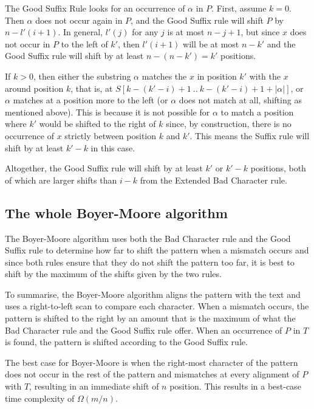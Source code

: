 The Good Suffix Rule looks for an occurrence of $\alpha$ in $P$. First, assume $k=0$. Then $\alpha$ does not occur again in $P$, and the Good Suffix rule will shift $P$ by $n-l'(i+1)$. In general, $l'(j)$ for any $j$ is at most $n-j+1$, but since $x$ does not occur in $P$ to the left of $k'$, then $l'(i+1)$ will be at most $n-k'$ and the Good Suffix rule will shift by at least $n-(n-k') = k'$ positions. 

If $k>0$, then either the substring $\alpha$ matches the $x$ in position $k'$ with the $x$ around position $k$, that is, at $S[k-(k'-i)+1\ ..\ k-(k'-i)+1+|\alpha|]$, or $\alpha$ matches at a position more to the left (or $\alpha$ does not match at all, shifting as mentioned above). This is because it is not possible for $\alpha$ to match a position where $k'$ would be shifted to the right of $k$ since, by construction, there is no occurrence of $x$ strictly between position $k$ and $k'$. This means the Suffix rule will shift by at least $k'-k$ in this case. 

Altogether, the Good Suffix rule will shift by at least $k'$ or $k'-k$ positions, both of which are larger shifts than $i-k$ from the Extended Bad Character rule. 

\rightline{$\square$}

\subsection{The whole Boyer-Moore algorithm}

The Boyer-Moore algorithm uses both the Bad Character rule and the Good Suffix rule to determine how far to shift the pattern when a mismatch occurs and since both rules ensure that they do not shift the pattern too far, it is best to shift by the maximum of the shifts given by the two rules. 

To summarise, the Boyer-Moore algorithm aligns the pattern with the text and uses a right-to-left scan to compare each character. When a mismatch occurs, the pattern is shifted to the right by an amount that is the maximum of what the Bad Character rule and the Good Suffix rule offer. When an occurrence of $P$ in $T$ is found, the pattern is shifted according to the Good Suffix rule. 

The best case for Boyer-Moore is when the right-most character of the pattern does not occur in the rest of the pattern and mismatches at every alignment of $P$ with $T$, resulting in an immediate shift of $n$ position. This results in a best-case time complexity of $\Omega(m/n)$. 

